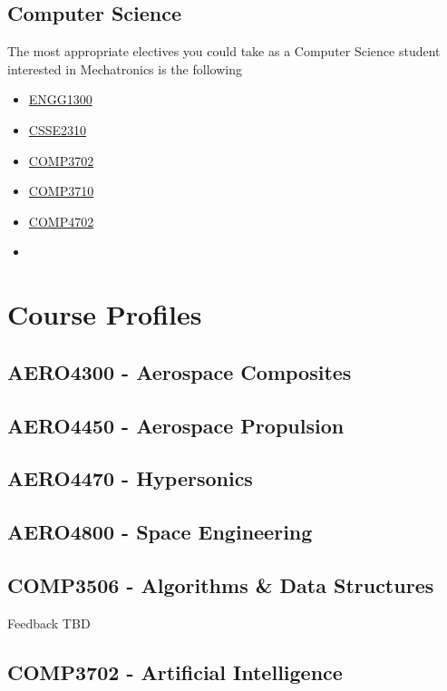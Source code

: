 \documentclass[a4paper,12pt]{report}
\begin{document}
\section{Computer Science}
The most appropriate electives you could take as a Computer Science student interested in Mechatronics is the following
\begin{multicols}{3}
    \begin{itemize}
        \item \hyperlink{ENGG1300}{ENGG1300}
        \item \hyperlink{CSSE2310}{CSSE2310}
        \item \hyperlink{COMP3702}{COMP3702}
        \item \hyperlink{COMP3710}{COMP3710}
        \item \hyperlink{COMP4702}{COMP4702}
        \item[]
    \end{itemize}
\end{multicols}


\chapter{Course Profiles}
\hypertarget{AERO4300}{\section{AERO4300 - Aerospace Composites}}

\hypertarget{AERO4450}{\section{AERO4450 - Aerospace Propulsion}}

\hypertarget{AERO4470}{\section{AERO4470 - Hypersonics}}

\hypertarget{AERO4800}{\section{AERO4800 - Space Engineering}}

\hypertarget{COMP3506}{\section{COMP3506 - Algorithms \& Data Structures}}
Feedback TBD

\hypertarget{COMP3702}{\section{COMP3702 - Artificial Intelligence}}
\end{document}
